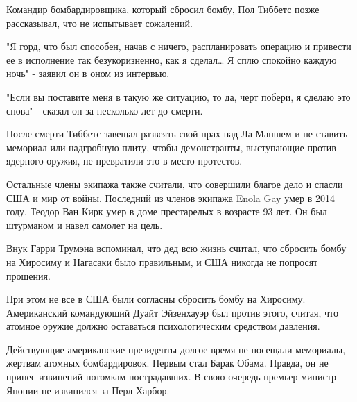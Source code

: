 Командир бомбардировщика, который сбросил бомбу, Пол Тиббетс позже рассказывал,
что не испытывает сожалений.

"Я горд, что был способен, начав с ничего, распланировать операцию и привести
ее в исполнение так безукоризненно, как я сделал… Я сплю спокойно каждую ночь"
- заявил он в оном из интервью.

"Если вы поставите меня в такую же ситуацию, то да, черт побери, я сделаю это
снова" - сказал он за несколько лет до смерти. 

После смерти Тиббетс завещал развеять свой прах над Ла-Маншем и не ставить
мемориал или надгробную плиту, чтобы демонстранты, выступающие против ядерного
оружия, не превратили это в место протестов.

Остальные члены экипажа также считали, что совершили благое дело и спасли США и
мир от войны. Последний из членов экипажа Enola Gay умер в 2014 году. Теодор
Ван Кирк умер в доме престарелых в возрасте 93 лет. Он был штурманом и навел
самолет на цель. 

Внук Гарри Трумэна вспоминал, что дед всю жизнь считал, что сбросить бомбу на
Хиросиму и Нагасаки было правильным, и США никогда не попросят прощения.

При этом не все в США были согласны сбросить бомбу на Хиросиму. Американский
командующий Дуайт Эйзенхауэр был против этого, считая, что атомное оружие
должно оставаться психологическим средством давления.

Действующие американские президенты долгое время не посещали мемориалы, жертвам
атомных бомбардировок. Первым стал Барак Обама. Правда, он не принес извинений
потомкам пострадавших. В свою очередь премьер-министр Японии не извинился за
Перл-Харбор.
